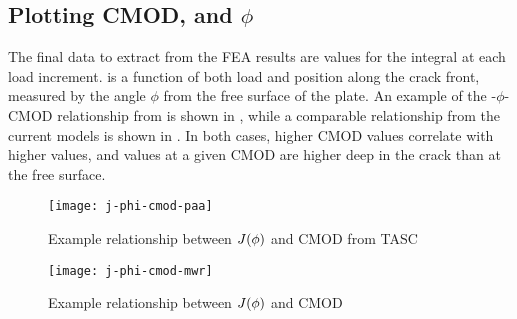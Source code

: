 \subsection{Plotting CMOD, \J and \(\phi\)}

The final data to extract from the FEA results are values for the \J integral at each load increment. \J is a function of both load and position along the crack front, measured by the angle \(\phi\) from the free surface of the plate.
An example of the \J-\(\phi\)-CMOD relationship from \cite{allenwells2014} is shown in , while a comparable relationship from the current models is shown in .
In both cases, higher CMOD values correlate with higher \J values, and \J values at a given CMOD are higher deep in the crack than at the free surface.
\begin{figure}[bp]
\centering
\texttt{[image: j-phi-cmod-paa]}
\caption[Example relationship between \(\J(\phi)\) and CMOD from TASC]{\label{fig:j-phi-cmod-paa} Example relationship between \(\J(\phi)\) and CMOD from TASC\citep{allenwells2014}}
\end{figure}

\begin{figure}[tbp]
\centering
\texttt{[image: j-phi-cmod-mwr]}
\caption{\label{fig:j-phi-cmod-mwr} Example relationship between \(\J(\phi)\) and CMOD}
\end{figure}

